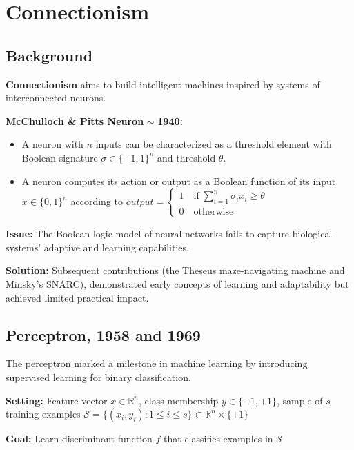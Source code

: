 \section{Connectionism}

\subsection{Background}


\textbf{Connectionism} aims to build intelligent machines inspired by
systems of interconnected neurons. 


\textbf{McChulloch \& Pitts Neuron} $\sim$ \textbf{1940:} 
\begin{itemize}
    \item A neuron with $n$ inputs can be characterized as a threshold element with Boolean signature $\sigma \in \{-1, 1\}^n$ and threshold $\theta$.
    \item A neuron computes its action or output as a Boolean function of its input $x \in \{0, 1\}^n$ according to $output = \begin{cases}
    1 \quad \text{if}\; \sum_{i = 1}^n \sigma_i x_i \geq \theta\\
    0 \quad \text{otherwise}
\end{cases}$
\end{itemize}  


\textbf{Issue:} The Boolean logic model of neural networks fails to capture biological systems' adaptive and learning capabilities. 


\textbf{Solution:} Subsequent contributions (the Theseus maze-navigating machine and Minsky's SNARC), demonstrated early concepts of learning and adaptability but achieved limited practical impact. 


\subsection{Perceptron, 1958 and 1969}


The perceptron marked a milestone in machine learning by introducing supervised learning for binary classification. 


\textbf{Setting:} Feature vector $x\in \mathbb{R}^n$, class membership $y \in \{-1, +1\}$, sample of $s$ training examples $\mathcal{S} = \{(x_i, y_i) : 1 \leq i \leq s\} \subset \mathbb{R}^n \times \{\pm1 \}$


\textbf{Goal:} Learn discriminant function $f$ that classifies examples in $\mathcal{S}$



